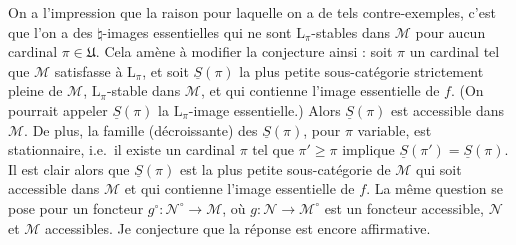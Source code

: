 \documentclass[11pt]{article}
\newcommand{\printedpage}[1]{\marginpar{\footnotesize p.~#1}}
\newcommand{\msp}[1]{\marginpar{\footnotesize [#1]}}
\begin{document}
On a l'impression que la raison pour laquelle on a de tels contre-exemples, c'est que l'on a des $\natural$-images essentielles qui ne sont $\mathrm{L}_\pi$-stables dans $\mathcal{M}$ pour aucun cardinal $\pi \in \mathfrak{U}$. Cela amène à modifier la conjecture ainsi : soit $\pi$ un cardinal tel que $\mathcal{M}$ satisfasse à $\mathrm{L}_\pi$,
\printedpage{182}
et soit $\underline{S}(\pi)$ la plus petite sous-catégorie strictement pleine de $\mathcal{M}$, $\mathrm{L}_\pi$-stable dans $\mathcal{M}$, et qui contienne l'image essentielle de $f$. (On pourrait appeler $\underline{S}(\pi)$ la $\mathrm{L}_\pi$-image essentielle.) Alors $\underline{S}(\pi)$ est accessible dans $\mathcal{M}$. De plus, la famille (décroissante) des $\underline{S}(\pi)$, pour $\pi$ variable, est stationnaire, i.e.\ il existe un cardinal $\pi$ tel que $\pi' \geqslant \pi$ implique $\underline{S}(\pi') = \underline{S}(\pi)$. Il est clair alors que $\underline{S}(\pi)$ est la plus petite sous-catégorie de $\mathcal{M}$ qui soit accessible dans $\mathcal{M}$ et qui contienne l'image essentielle de $f$. La même question se pose pour un foncteur $g^\circ : \mathcal{N}^\circ \longrightarrow \mathcal{M}$, où $g : \mathcal{N} \longrightarrow \mathcal{M}^\circ$ est un foncteur accessible, $\mathcal{N}$ et $\mathcal{M}$ accessibles. Je conjecture que la réponse est encore affirmative.

\msp{471}
\end{document}
